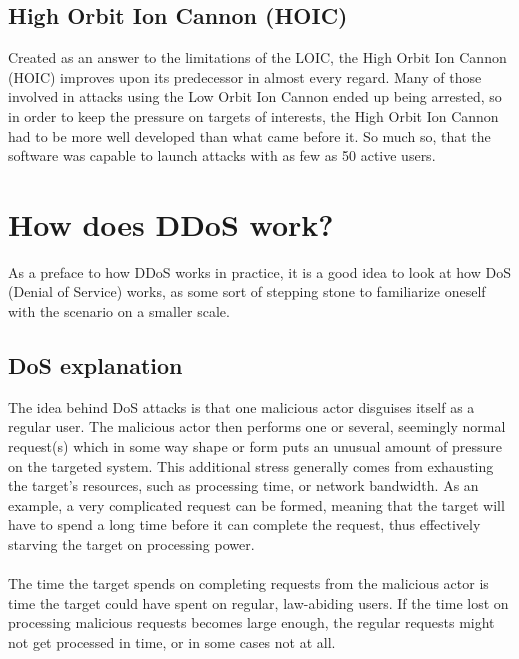 \documentclass[a4paper, titlepage,12pt]{article}
\begin{document}
	\subsection{High Orbit Ion Cannon (HOIC)}
		Created as an answer to the limitations of the LOIC, the High Orbit Ion Cannon (HOIC) improves upon its predecessor in almost every regard. Many of those involved in attacks using the Low Orbit Ion Cannon ended up being arrested, so in order to keep the pressure on targets of interests, the High Orbit Ion Cannon had to be more well developed than what came before it. So much so, that the software was capable to launch attacks with as few as 50 active users.
	\section{How does DDoS work?}
		As a preface to how DDoS works in practice, it is a good idea to look at how DoS (Denial of Service) works, as some sort of stepping stone to familiarize oneself with the scenario on a smaller scale. 
	\subsection{DoS explanation}
		The idea behind DoS attacks is that one malicious actor disguises itself as a regular user. The malicious actor then performs one or several, seemingly normal request(s) which in some way shape or form puts an unusual amount of pressure on the targeted system. This additional stress generally comes from exhausting the target's resources, such as processing time, or network bandwidth. As an example, a very complicated request can be formed, meaning that the target will have to spend a long time before it can complete the request, thus effectively starving the target on processing power. 
\\\\
		The time the target spends on completing requests from the malicious actor is time the target could have spent on regular, law-abiding users. If the time lost on processing malicious requests becomes large enough, the regular requests might not get processed in time, or in some cases not at all.
\end{document}
